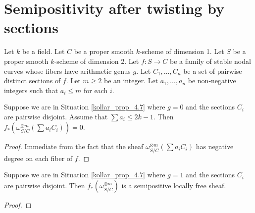 \section{Semipositivity after twisting by sections}

\begin{situation}\label{kollar_prop_4.7}
Let $k$ be a field.
Let $C$ be a proper smooth $k$-scheme of dimension 1.
Let $S$ be a proper smooth $k$-scheme of dimension 2.
Let $f:S\to C$ be a family of stable nodal curves whose fibers have arithmetic genus $g$.
Let $C_1,\ldots,C_n$ be a set of pairwise distinct sections of $f$.
Let $m\ge2$ be an integer.
Let $a_1,\ldots,a_n$ be non-negative integers such that $a_i\le m$ for each $i$.
\end{situation}

\begin{lemma}\label{base_case_genus_0}
Suppose we are in Situation \ref{kollar_prop_4.7} where $g=0$ and the sections $C_i$ are pairwise disjoint.
Assume that $\sum a_i\le 2k-1$.
Then $f_{*}(\omega_{S/C}^{\otimes m}(\sum a_iC_i))=0$.
\end{lemma}
\begin{proof}
Immediate from the fact that the sheaf $\omega_{S/C}^{\otimes m}(\sum a_iC_i)$ has negative degree on each fiber of $f$.
\end{proof}

\begin{lemma}\label{base_case_genus_1}
Suppose we are in Situation \ref{kollar_prop_4.7} where $g=1$ and the sections $C_i$ are pairwise disjoint.
Then $f_{*}(\omega_{S/C}^{\otimes m})$ is a semipositive locally free sheaf.
\end{lemma}
\begin{proof}
\end{proof}

